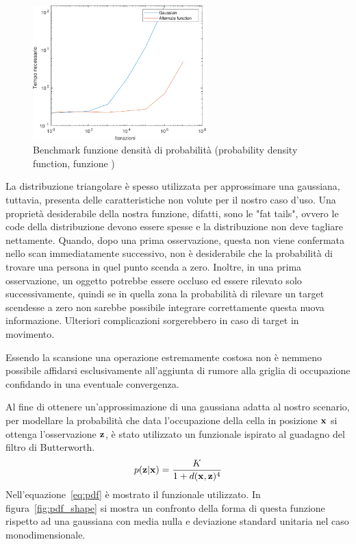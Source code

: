 \documentclass[a4paper]{article}
\begin{document}
	\begin{figure}[H]
		\centering
		\includegraphics[width=0.6\textwidth]{./img/pdf_benchmark.pdf}
		\caption{Benchmark funzione densità di probabilità (probability density function, funzione )}
		\label{fig:pdf_benchmark}
	\end{figure}

	La distribuzione triangolare è spesso utilizzata per approssimare una
	gaussiana, tuttavia, presenta delle caratteristiche non volute per il
	nostro caso d'uso. Una proprietà desiderabile della nostra funzione,
	difatti, sono le "fat tails", ovvero le code della distribuzione devono
	essere spesse e la distribuzione non deve tagliare nettamente. Quando, dopo
	una prima osservazione, questa non viene confermata nello scan
	immediatamente successivo, non è desiderabile che la probabilità di trovare
	una persona in quel punto scenda a zero. Inoltre, in una prima
	osservazione, un oggetto potrebbe essere occluso ed essere rilevato solo
	successivamente, quindi se in quella zona la probabilità di rilevare un
	target scendesse a zero non sarebbe possibile integrare correttamente
	questa nuova informazione.  Ulteriori complicazioni sorgerebbero in caso di
	target in movimento.
	
	Essendo la scansione una operazione estremamente costosa non è nemmeno
	possibile affidarsi esclusivamente all'aggiunta di rumore alla griglia di
	occupazione confidando in una eventuale convergenza.

	Al fine di ottenere un'approssimazione di una gaussiana adatta al
	nostro scenario, per modellare la probabilità che data l'occupazione della
	cella in posizione $ {\bf x} $ si ottenga l'osservazione $ {\bf z} $, è
	stato utilizzato un funzionale ispirato al guadagno del filtro di
	Butterworth.
	\begin{equation}\label{eq:pdf}
		p({\bf z}|{\bf x}) = \frac	{K}
		{1 + d({\bf x},{\bf z})^4 } 
	\end{equation}
	Nell'equazione~\ref{eq:pdf} è mostrato il funzionale utilizzato. In
	figura~\ref{fig:pdf_shape} si mostra un confronto della forma di questa
	funzione rispetto ad una gaussiana con media nulla e deviazione standard
	unitaria nel caso monodimensionale.
	
\end{document}

